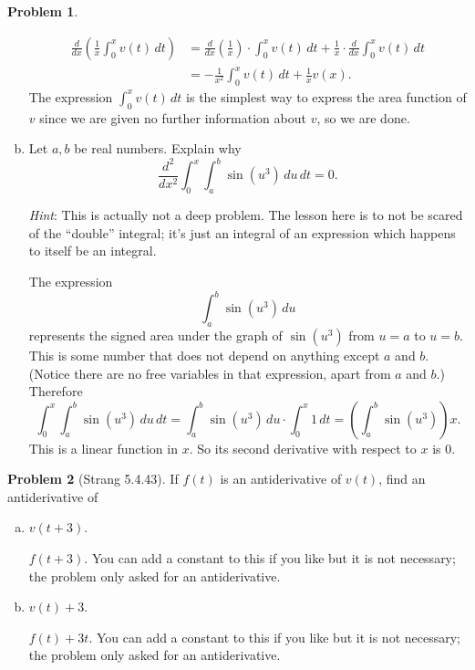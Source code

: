 \documentclass[11pt,oneside]{amsart}
\theoremstyle{definition}
\newtheorem{problem}{Problem}
\begin{document}
\begin{problem}
\begin{enumerate}[(a)]
\begin{solution}
\begin{align*}
                    \frac d{dx}\left(\frac 1x\int_0^x v(t)\,dt\right) &= \frac d{dx}\left(\frac 1x\right)\cdot\int_0^x v(t)\,dt+\frac 1x\cdot\frac d{dx}\int_0^x v(t)\,dt\\
                    &= -\frac1{x^2}\int_0^x v(t)\,dt+\frac 1x v(x).
                \end{align*}
                The expression $\int_0^x v(t)\,dt$ is the simplest way to express the area function of $v$ since we are given no further information about $v$, so we are done.
            \end{solution}
            \item Let $a,b$ be real numbers. Explain why
            \[\frac {d^2}{dx^2}\int_0^x\int_a^b \sin(u^3)\,du\,dt=0.\]

            \emph{Hint}: This is actually not a deep problem. The lesson here is to not be scared of the ``double'' integral; it's just an integral of an expression which happens to itself be an integral.
            \begin{solution}
                The expression
                \[\int_a^b\sin(u^3)\,du\]
                represents the signed area under the graph of $\sin(u^3)$ from $u=a$ to $u=b$. This is some number that does not depend on anything except $a$ and $b$. (Notice there are no free variables in that expression, apart from $a$ and $b$.) Therefore
                \[\int_0^x\int_a^b\sin(u^3)\,du\,dt = \int_a^b\sin(u^3)\,du\cdot\int_0^x 1\,dt=\left( \int_a^b\sin(u^3) \right)x.\]
                This is a linear function in $x$. So its second derivative with respect to $x$ is 0.
            \end{solution}
        \end{enumerate}
    \end{problem}

    \begin{problem}[Strang 5.4.43]
        If $f(t)$ is an antiderivative of $v(t)$, find an antiderivative of
        \begin{enumerate}[(a)]
            \item $v(t+3)$.
            \begin{solution}
                $f(t+3)$. You can add a constant to this if you like but it is not necessary; the problem only asked for an antiderivative.
            \end{solution}
            \item $v(t)+3$.
            \begin{solution}
                $f(t)+3t$. You can add a constant to this if you like but it is not necessary; the problem only asked for an antiderivative.
            \end{solution}
        \end{enumerate}
    \end{problem}
\end{document}
